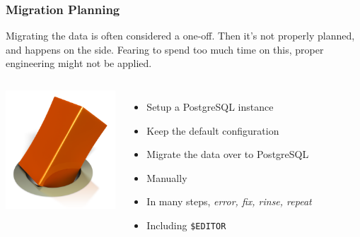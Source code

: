 \documentclass{beamer}
\begin{document}
\begin{frame}[fragile]
  \frametitle{Migration Planning}

  Migrating the data is often considered a one-off. Then it's not properly
  planned, and happens on the side. Fearing to spend too much time on this,
  proper engineering might not be applied.

  \vfill
  
  \begin{columns}[c]
    \begin{center}
      \includegraphics[height=12em]{round_hole_square_peg_6617.png}
    \end{center}

    \begin{itemize}
    \item Setup a PostgreSQL instance
    \item Keep the default configuration
    \item Migrate the data over to PostgreSQL
    \item Manually
    \item In many steps, \textit{error, fix, rinse, repeat}
    \item Including \texttt{\$EDITOR}
    \end{itemize}
  \end{columns}
\end{frame}
\end{document}

